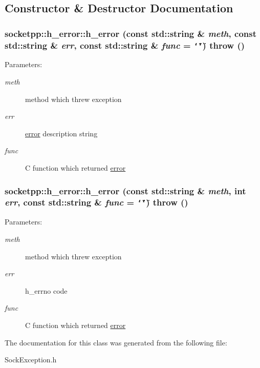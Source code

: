 \subsection{Constructor \& Destructor Documentation}
\hypertarget{classsocketpp_1_1h__error_c15a1c6216114250241349fdfcdeb98a}{
\subsubsection{\setlength{\rightskip}{0pt plus 5cm}socketpp::h\_\-error::h\_\-error (const std::string \& {\em meth}, \/  const std::string \& {\em err}, \/  const std::string \& {\em func} = {\tt \char`\"{}\char`\"{}})  throw ()}}
\label{classsocketpp_1_1h__error_c15a1c6216114250241349fdfcdeb98a}


\begin{Desc}
\item[Parameters:]
\begin{description}
\item[{\em meth}]method which threw exception \item[{\em err}]\hyperlink{classsocketpp_1_1error}{error} description string \item[{\em func}]C function which returned \hyperlink{classsocketpp_1_1error}{error} \end{description}
\end{Desc}
\hypertarget{classsocketpp_1_1h__error_67e7b6bcd23ebdd79a5fdcf1f01070fe}{
\subsubsection{\setlength{\rightskip}{0pt plus 5cm}socketpp::h\_\-error::h\_\-error (const std::string \& {\em meth}, \/  int {\em err}, \/  const std::string \& {\em func} = {\tt \char`\"{}\char`\"{}})  throw ()}}
\label{classsocketpp_1_1h__error_67e7b6bcd23ebdd79a5fdcf1f01070fe}


\begin{Desc}
\item[Parameters:]
\begin{description}
\item[{\em meth}]method which threw exception \item[{\em err}]h\_\-errno code \item[{\em func}]C function which returned \hyperlink{classsocketpp_1_1error}{error} \end{description}
\end{Desc}


The documentation for this class was generated from the following file:\begin{CompactItemize}
\item 
SockException.h\end{CompactItemize}
